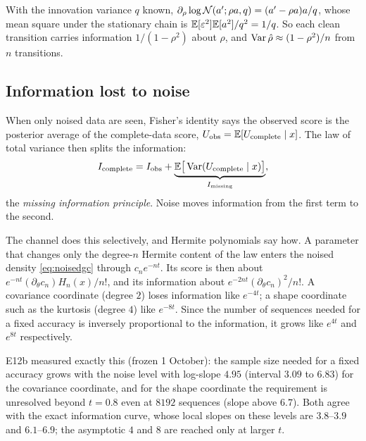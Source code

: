 \begin{example}[AR(1)]
With the innovation variance $q$ known, $\partial_\rho\log\mathcal{N}(a';\rho a,q)=(a'-\rho a)a/q$, whose mean square under the
stationary chain is $\mathbb{E}[\varepsilon^2]\mathbb{E}[a^2]/q^2=1/q$. So each clean transition carries information $1/(1-\rho^2)$ about
$\rho$, and $\operatorname{Var}\hat\rho\approx(1-\rho^2)/n$ from $n$ transitions.
\end{example}

\subsection{Information lost to noise}

When only noised data are seen, Fisher's identity says the observed score is the posterior average of the
complete-data score, $U_{\rm obs}=\mathbb{E}[U_{\rm complete}\mid x]$. The law of total variance then splits the information:
\begin{equation}\label{eq:missinginfo}
  I_{\rm complete}=I_{\rm obs}+\underbrace{\mathbb{E}\big[\operatorname{Var}(U_{\rm complete}\mid x)\big]}_{I_{\rm missing}},
\end{equation}
the \emph{missing information principle}. Noise moves information from the first term to the second.

The channel does this selectively, and Hermite polynomials say how. A parameter that changes only the
degree-$n$ Hermite content of the law enters the noised density \eqref{eq:noisedgc} through $c_ne^{-nt}$. Its score
is then about $e^{-nt}(\partial_\theta c_n)H_n(x)/n!$, and its information about $e^{-2nt}(\partial_\theta c_n)^2/n!$. A
covariance coordinate (degree $2$) loses information like $e^{-4t}$; a shape coordinate such as the kurtosis
(degree $4$) like $e^{-8t}$. Since the number of sequences needed for a fixed accuracy is inversely
proportional to the information, it grows like $e^{4t}$ and $e^{8t}$ respectively.

\begin{inproject}
E12b measured exactly this (frozen 1 October): the sample size needed for a fixed accuracy grows with the
noise level with log-slope $4.95$ (interval $3.09$ to $6.83$) for the covariance coordinate, and for the shape
coordinate the requirement is unresolved beyond $t=0.8$ even at $8192$ sequences (slope above $6.7$). Both agree
with the exact information curve, whose local slopes on these levels are $3.8$--$3.9$ and $6.1$--$6.9$; the
asymptotic $4$ and $8$ are reached only at larger $t$.
\end{inproject}

